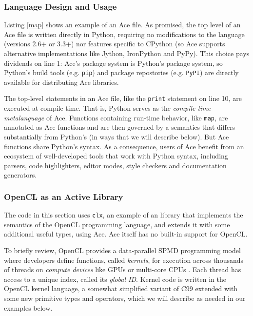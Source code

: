 \subsubsection{Language Design and Usage}\label{usage}
Listing \ref{map} shows an example of an Ace file. As promised, the top level of an Ace file is written directly in Python, requiring no modifications to the language (versions 2.6+ or 3.3+) nor features specific to CPython (so Ace supports alternative implementations like Jython, IronPython and PyPy). This choice pays  dividends on line 1: Ace's package system is Python's package system, so Python's build tools (e.g. \verb|pip|) and package repostories (e.g. \verb|PyPI|) are directly available for distributing Ace libraries. 

The top-level statements in an Ace file, like the \verb|print| statement on line 10, are executed at compile-time. That is, Python serves as the \emph{compile-time metalanguage} of Ace. %
Functions containing run-time behavior, like \verb|map|, are annotated as Ace functions and are then governed by a semantics that differs substantially from Python's (in ways that we will describe below). But Ace functions share Python's syntax. As a consequence, users of Ace benefit from an ecosystem of well-developed tools that work with Python syntax, including parsers, code highlighters, editor modes, style checkers and documentation generators. 

\subsubsection{OpenCL as an Active Library}
The code in this section uses \verb|clx|, an example of an library that implements the semantics of the OpenCL programming language, and extends it with some additional useful types, using Ace. Ace itself has no built-in support for OpenCL.

To briefly review, OpenCL provides a data-parallel SPMD programming model where developers define functions, called {\em kernels}, for execution across thousands of threads on \emph{compute devices} like GPUs or multi-core CPUs \cite{opencl11}. Each thread has access to a unique index, called its \emph{global ID}. Kernel code is written in the OpenCL kernel language, a somewhat simplified variant of C99 extended with some new primitive types and operators, which we will describe as needed in our examples below.

